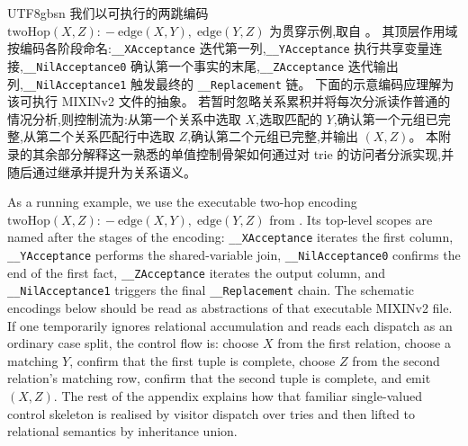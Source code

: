 \begin{CJK*}{UTF8}{gbsn}
\ifPaperChinese
我们以可执行的两跳编码
$\mathrm{twoHop}(X, Z) \mathrel{{:}\!{-}} \mathrm{edge}(X, Y),\; \mathrm{edge}(Y, Z)$
为贯穿示例,取自
。
其顶层作用域按编码各阶段命名:\texttt{__XAcceptance} 迭代第一列,\texttt{__YAcceptance} 执行共享变量连接,\texttt{__NilAcceptance0} 确认第一个事实的末尾,\texttt{__ZAcceptance} 迭代输出列,\texttt{__NilAcceptance1} 触发最终的 \texttt{__Replacement} 链。
下面的示意编码应理解为该可执行 MIXINv2 文件的抽象。
若暂时忽略关系累积并将每次分派读作普通的情况分析,则控制流为:从第一个关系中选取 $X$,选取匹配的 $Y$,确认第一个元组已完整,从第二个关系匹配行中选取 $Z$,确认第二个元组已完整,并输出 $(X, Z)$。
本附录的其余部分解释这一熟悉的单值控制骨架如何通过对 trie 的访问者分派实现,并随后通过继承并提升为关系语义。
\else
\begin{sloppypar}
As a running example, we use the executable two-hop encoding
$\mathrm{twoHop}(X, Z) \mathrel{{:}\!{-}} \mathrm{edge}(X, Y),\allowbreak\; \mathrm{edge}(Y, Z)$
from
.
Its top-level scopes are named after the stages of the
encoding: \texttt{__XAcceptance} iterates the first column,
\texttt{__YAcceptance} performs the shared-variable join,
\texttt{__NilAcceptance0} confirms the end of the first fact,
\texttt{__ZAcceptance} iterates the output column, and
\texttt{__NilAcceptance1} triggers the final
\texttt{__Replacement} chain.
The schematic encodings below should be read as abstractions
of that executable MIXINv2 file.
If one temporarily ignores relational accumulation and reads
each dispatch as an ordinary case split, the control flow is:
choose $X$ from the first relation, choose a matching $Y$,
confirm that the first tuple is complete, choose $Z$ from the
second relation's matching row, confirm that the second tuple
is complete, and emit $(X, Z)$.
The rest of the appendix explains how that familiar
single-valued control skeleton is realised by visitor dispatch
over tries and then lifted to relational semantics by
inheritance union.
\end{sloppypar}
\fi

\subsection{}


\end{CJK*}
